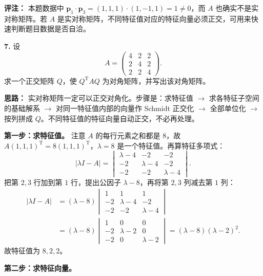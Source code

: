 \textbf{评注：} 本题数据中 \(\mathbf{p}_1\cdot\mathbf{p}_3=(1,1,1)\cdot(1,-1,1)=1\neq0\)，而 \(A\) 也确实不是实对称矩阵。若 \(A\) 是实对称矩阵，不同特征值对应的特征向量必须正交，可用来快速判断题目数据是否自洽。

\else \answerarea[10] \fi%

\textbf{7.} 设
\[
A=\begin{pmatrix}4&2&2\\2&4&2\\2&2&4\end{pmatrix}.
\]
求一个正交矩阵 \(Q\)，使 \(Q^{\mathrm{T}}AQ\) 为对角矩阵，并写出该对角矩阵。

\ifshowsolutions%
\textbf{思路：} 实对称矩阵一定可以正交对角化。步骤是：求特征值 \(\to\) 求各特征子空间的基础解系 \(\to\) 对同一特征值内部的向量作 Schmidt 正交化 \(\to\) 全部单位化 \(\to\) 按列拼成 \(Q\)。不同特征值的特征向量自动正交，不必再处理。

\textbf{第一步：求特征值。} 注意 \(A\) 的每行元素之和都是 \(8\)，故 \(A(1,1,1)^{\mathrm{T}}=8(1,1,1)^{\mathrm{T}}\)，\(\lambda=8\) 是一个特征值。再算特征多项式：
\[
|\lambda I-A|=
\begin{vmatrix}
\lambda-4&-2&-2\\
-2&\lambda-4&-2\\
-2&-2&\lambda-4
\end{vmatrix}.
\]
把第 \(2,3\) 行加到第 \(1\) 行，提出公因子 \(\lambda-8\)，再将第 \(2,3\) 列减去第 \(1\) 列：
\[
\begin{aligned}
|\lambda I-A|&=(\lambda-8)
\begin{vmatrix}
1&1&1\\
-2&\lambda-4&-2\\
-2&-2&\lambda-4
\end{vmatrix}\\
&=(\lambda-8)
\begin{vmatrix}
1&0&0\\
-2&\lambda-2&0\\
-2&0&\lambda-2
\end{vmatrix}
=(\lambda-8)(\lambda-2)^2.
\end{aligned}
\]
故特征值为 \(8,2,2\)。

\textbf{第二步：求特征向量。}


